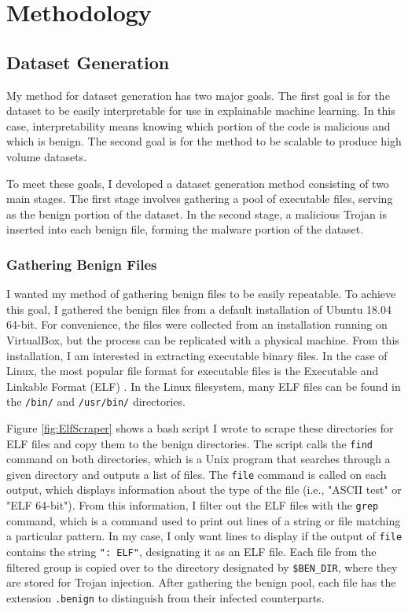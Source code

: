 \documentclass[12pt, letterpaper, titlepage]{article}
\newcommand{\figRef}[1]{Figure \ref{#1}}
\newcommand{\ubu}{Ubuntu}
\newcommand{\ubuVer}{18.04 64-bit}
\newcommand{\vb}{VirtualBox}
\begin{document}
\section{Methodology}
\subsection{Dataset Generation}
My method for dataset generation has two major goals.
The first goal is for the dataset to be easily interpretable for use in explainable machine learning.
In this case, interpretability means knowing which portion of the code is malicious and which is benign.
The second goal is for the method to be scalable to produce high volume datasets.

To meet these goals, I developed a dataset generation method consisting of two main stages.
The first stage involves gathering a pool of executable files, serving as the benign portion of the dataset.
In the second stage, a malicious Trojan is inserted into each benign file, forming the malware portion of the dataset.

\subsubsection{Gathering Benign Files}
I wanted my method of gathering benign files to be easily repeatable.
To achieve this goal, I gathered the benign files from a default installation of \ubu{} \ubuVer{}.
For convenience, the files were collected from an installation running on \vb{}, but the process can be replicated with a physical machine.
From this installation, I am interested in extracting executable binary files.
In the case of Linux, the most popular file format for executable files is the Executable and Linkable Format (ELF) \cite{ELF}.
In the Linux filesystem, many ELF files can be found in the \verb|/bin/| and \verb|/usr/bin/| directories.

\figRef{fig:ElfScraper} shows a bash script I wrote to scrape these directories for ELF files and copy them to the benign directories.
The script calls the \verb|find| command on both directories, which is a Unix program that searches through a given directory and outputs a list of files.
The \verb|file| command is called on each output, which displays information about the type of the file (i.e., "ASCII test" or "ELF 64-bit").
From this information, I filter out the ELF files with the \verb|grep| command, which is a command used to print out lines of a string or file matching a particular pattern.
In my case, I only want lines to display if the output of \verb|file| contains the string \verb|": ELF"|, designating it as an ELF file.
Each file from the filtered group is copied over to the directory designated by \verb|$BEN_DIR|, where they are stored for Trojan injection.
After gathering the benign pool, each file has the extension \verb|.benign| to distinguish from their infected counterparts.
\end{document}
